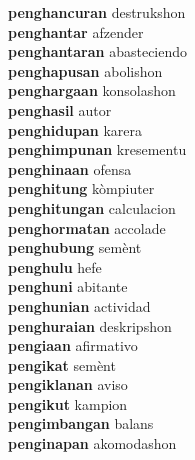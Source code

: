 \textbf{penghancuran } destrukshon \\
\textbf{penghantar } afzender \\
\textbf{penghantaran } abasteciendo \\
\textbf{penghapusan } abolishon \\
\textbf{penghargaan } konsolashon \\
\textbf{penghasil } autor \\
\textbf{penghidupan } karera \\
\textbf{penghimpunan } kresementu \\
\textbf{penghinaan } ofensa \\
\textbf{penghitung } kòmpiuter \\
\textbf{penghitungan } calculacion \\
\textbf{penghormatan } accolade \\
\textbf{penghubung } semènt \\
\textbf{penghulu } hefe \\
\textbf{penghuni } abitante \\
\textbf{penghunian } actividad \\
\textbf{penghuraian } deskripshon \\
\textbf{pengiaan } afirmativo \\
\textbf{pengikat } semènt \\
\textbf{pengiklanan } aviso \\
\textbf{pengikut } kampion \\
\textbf{pengimbangan } balans \\
\textbf{penginapan } akomodashon \\
